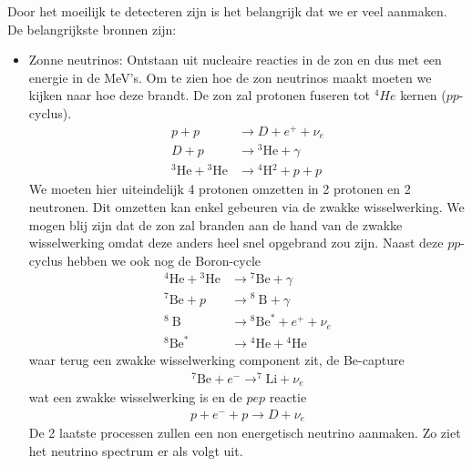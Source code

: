 \documentclass[../main.tex]{subfiles}
\begin{document}
Door het moeilijk te detecteren zijn is het belangrijk dat we er veel aanmaken. De belangrijkste bronnen zijn:
\begin{itemize}
    \item Zonne neutrinos: Ontstaan uit nucleaire reacties in de zon en dus met een energie in de MeV's. Om te zien hoe de zon neutrinos maakt moeten we kijken naar hoe deze brandt. De zon zal protonen fuseren tot $^4He$ kernen ($pp$-cyclus).
        \begin{equation}
            \begin{aligned}
                \label{eq:zon_fusie}
                p+p & \rightarrow D+e^{+}+\nu_{e} \\
                D+p & \rightarrow{ }^{3} \mathrm{He}+\gamma \\
                { }^{3} \mathrm{He}+{ }^{3} \mathrm{He} & \rightarrow{ }^{4} \mathrm{H}{ }^{2}+p+p
            \end{aligned}
        \end{equation}
        We moeten hier uiteindelijk 4 protonen omzetten in 2 protonen en 2 neutronen. Dit omzetten kan enkel gebeuren via de zwakke wisselwerking. We mogen blij zijn dat de zon zal branden aan de hand van de zwakke wisselwerking omdat deze anders heel snel opgebrand zou zijn. Naast deze $pp$-cyclus hebben we ook nog de Boron-cycle
        \begin{equation}
            \begin{aligned}
                \label{eq:boron_cyclus}
                { }^{4} \mathrm{He}+{ }^{3} \mathrm{He} & \rightarrow{ }^{7} \mathrm{Be}+\gamma \\
                { }^{7} \mathrm{Be}+p & \rightarrow{ }^{8} \mathrm{~B}+\gamma \\
                { }^{8} \mathrm{~B} & \rightarrow{ }^{8} \mathrm{Be}^{*}+e^{+}+\nu_{e} \\
                { }^{8} \mathrm{Be}^{*} & \rightarrow{ }^{4} \mathrm{He}+{ }^{4} \mathrm{He}
            \end{aligned}
        \end{equation}
        waar terug een zwakke wisselwerking component zit, de Be-capture
        \begin{equation}
            \begin{aligned}
                \label{eq:be_capture}
                { }^{7} \mathrm{Be}+e^{-} \rightarrow^{7} \mathrm{Li}+\nu_{e}
            \end{aligned}
        \end{equation}
        wat een zwakke wisselwerking is en de $pep$ reactie
        \begin{equation}
            \begin{aligned}
                \label{eq:pep}
                p+e^{-}+p \rightarrow D+\nu_{e}
            \end{aligned}
        \end{equation}
        De 2 laatste processen zullen een non energetisch neutrino aanmaken. Zo ziet het neutrino spectrum er als volgt uit.


\end{itemize}
\end{document}
